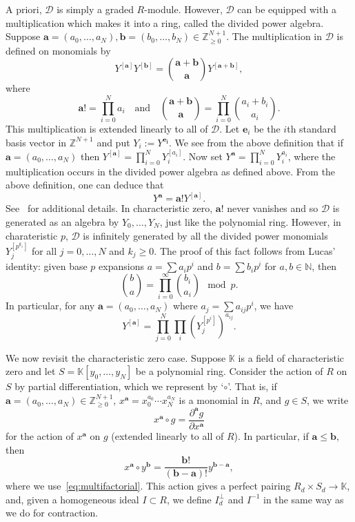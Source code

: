 \documentclass[12pt, reqno]{amsart}
\numberwithin{equation}{section}
\newcommand{\N}{{\mathbb N}}
\newcommand{\Z}{{\mathbb Z}}
\newcommand{\kk}{\mathbb{K}}
\theoremstyle{plain} %
\theoremstyle{definition}
\theoremstyle{remark}
\begin{document}
A priori, $\mathcal{D}$ is simply a graded $R$-module.  However, $\mathcal{D}$ can be equipped with a multiplication which makes it into a ring, called the divided power algebra.  Suppose $\mathbf{a}=(a_0,\ldots,a_N),\mathbf{b}=(b_0,\ldots,b_N)\in \Z^{N+1}_{\ge 0}$.  The multiplication in $\mathcal{D}$ is defined on monomials by
\begin{equation}\label{eq:dividedmultiplication}
Y^{[\mathbf{a}]}Y^{[\mathbf{b}]}= {\mathbf{a}+\mathbf{b} \choose \mathbf{a} } Y^{[\mathbf{a+b}]},
\end{equation}
where
\begin{equation}\label{eq:multifactorial}
\mathbf{a}!=\prod_{i=0}^N a_i \quad\mbox{and}\quad \binom{\mathbf{a}+\mathbf{b}}{\mathbf{a}}=\prod_{i=0}^N \binom{a_i+b_i}{a_i}.
\end{equation}
This multiplication is extended linearly to all of $\mathcal{D}$.  Let $\mathbf{e}_i$ be the $i$th standard basis vector in $\Z^{N+1}$ and put $Y_i:=Y^{\mathbf{e_i}}$.  We see from the above definition that if $\mathbf{a}=(a_0,\ldots,a_N)$ then $Y^{[\mathbf{a}]}=\prod_{i=0}^N Y_i^{[a_i]}$.  Now set $Y^{\mathbf{a}}=\prod_{i=0}^N Y_i^{a_i}$, where the multiplication occurs in the divided power algebra as defined above.  From the above definition, one can deduce that
\begin{equation}\label{eq:regularmonomialtodividedmonomial}
Y^{\mathbf{a}}=\mathbf{a}! Y^{[\mathbf{a}]}.
\end{equation}
See~\cite[Lecture~9]{Ger95} for additional details.  In characteristic zero, $\mathbf{a}!$ never vanishes and so $\mathcal{D}$ is generated as an algebra by $Y_0,\ldots,Y_N$, just like the polynomial ring.  However, in charateristic $p$, $\mathcal{D}$ is infinitely generated by all the divided power monomials $Y_j^{[p^{k_i}]}$ for all $j=0,\ldots ,N$ and $k_j\ge 0$. The proof of this fact follows from Lucas' identity: given base $p$ expansions $a=\sum a_ip^i$ and $b=\sum b_ip^i$ for $a, b\in\N$,  then
\[
{b \choose a} = \prod_{i=0}^\infty {b_i \choose a_i} \mod p.
\]
In particular, for any $\mathbf{a}=(a_0,\ldots,a_N)$ where $a_j=\sum a_{ij}p^i$, we have
\[
Y^{[\mathbf{a}]}=\prod_{j=0}^N \prod_{i} (Y_j^{[p^i]})^{a_{ij}}.
\]

We now revisit the characteristic zero case.  Suppose $\kk$ is a field of characteristic zero and let $S=\kk[y_0,\ldots,y_N]$ be a polynomial ring.  Consider the action of $R$ on $S$ by partial differentiation, which we represent by `$\circ$'.  That is, if $\mathbf{a}=(a_0,\ldots,a_N)\in \Z^{N+1}_{\ge 0}$, $x^\mathbf{a}=x_0^{a_0}\cdots x_N^{a_N}$ is a monomial in $R$, and $g\in S$, we write
\[
x^{\mathbf{a}}\circ g=\frac{\partial^{\mathbf{a}}g}{\partial x^{\mathbf{a}}}
\]
for the action of $x^{\mathbf{a}}$ on $g$ (extended linearly to all of $R$).  In particular, if $\mathbf{a}\le \mathbf{b}$, then
\[
x^{\mathbf{a}}\circ y^{\mathbf{b}}=\frac{\mathbf{b}!}{(\mathbf{b}-\mathbf{a})!}y^{\mathbf{b}-\mathbf{a}},
\]
where we  use~\eqref{eq:multifactorial}.  This action gives a perfect pairing $R_d\times S_d\to \kk$, and, given a homogeneous ideal $I\subset R$, we define $I_d^{\perp}$ and $I^{-1}$ in the same way as we do for contraction.
\end{document}
